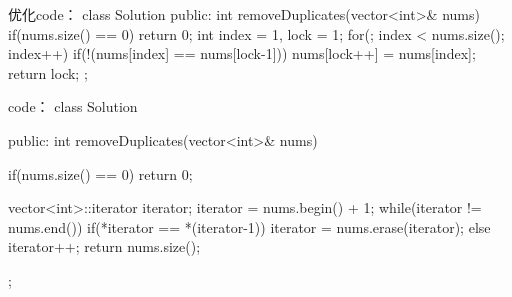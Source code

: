 优化code：
class Solution {
public:
    int removeDuplicates(vector<int>& nums) {
        if(nums.size() == 0) return 0;
        int index = 1, lock = 1;
        for(; index < nums.size(); index++)
        {
            if(!(nums[index] == nums[lock-1]))
                nums[lock++] = nums[index];
        }
        return lock;
    }
};










code：
class Solution {
public:
    int removeDuplicates(vector<int>& nums) {
        if(nums.size() == 0) return 0;
        
        vector<int>::iterator iterator;
        iterator = nums.begin() + 1;
        while(iterator != nums.end())
        {
            if(*iterator == *(iterator-1))
            {
                iterator = nums.erase(iterator);
            }
            else iterator++;
        }
        return nums.size();
    }
};